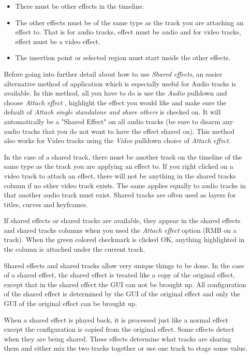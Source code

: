 \begin{itemize}[noitemsep]
    \item There must be other effects in the timeline.
    \item The other effects must be of the same type as the track you are attaching an effect to. That is for audio tracks, effect must be audio and for video tracks, effect must be a video effect.
    \item The insertion point or selected region must start inside the other effects.
\end{itemize}

Before going into further detail about how to use \textit{Shared effects}, an easier
alternative method of application which is especially useful for Audio tracks is
available.  In this method, all you have to do is use the \textit{Audio} pulldown and
choose \textit{Attach effect} , highlight the effect you would like and make sure the
default of \textit{Attach single standalone and share others} is checked on.  It will
automatically be a "Shared Effect" on all audio tracks (be sure to disarm any audio
tracks that you do not want to have the effect shared on).  This method also works for
Video tracks using the \textit{Video} pulldown choice of \textit{Attach effect}.

In the case of a shared track, there must be another track on the timeline of the same type as the track you are applying an effect to. If you right clicked on a video track to attach an effect, there will not be anything in the shared tracks column if no other video track exists. The same applies equally to audio tracks in that another audio track must exist. Shared tracks are often used as layers for titles, curves and keyframes.

If shared effects or shared tracks are available, they appear in the shared effects and shared tracks columns when you used the \textit{Attach effect} option (RMB on a track). When the green colored checkmark is clicked OK, anything highlighted in the column is attached under the current track.

Shared effects and shared tracks allow very unique things to be done. In the case of a shared effect, the shared effect is treated like a copy of the original effect, except that in the shared effect the GUI can not be brought up. All configuration of the shared effect is determined by the GUI of the original effect and only the GUI of the original effect can be brought up.

When a shared effect is played back, it is processed just like a normal effect except the configuration is copied from the original effect. Some effects detect when they are being shared. These effects determine what tracks are sharing them and either mix the two tracks together or use one track to stage some value.

